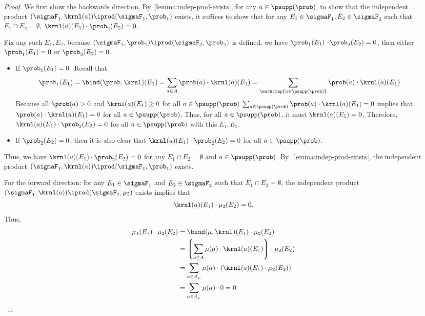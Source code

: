  \begin{proof}
    We first show the backwards direction.
  By~\cref{lemma:indep-prod-exists},
  for any $a \in \psupp(\prob)$, to show that the independent product
  $(\sigmaF_1, \krnl(a)) \iprod (\sigmaF_1, \prob_1)$ exists,
  it suffices to show that for any $E_1 \in \sigmaF_1, E_2 \in \sigmaF_2$
  such that $E_1 \cap E_2 = \emptyset$,
  $\krnl(a)(E_1) \cdot \prob_2(E_2) = 0$.

  Fix any such $E_1, E_2$,
  because $(\sigmaF_1, \prob_1) \iprod (\sigmaF_2, \prob_2)$ is defined,
  we have $\prob_1(E_1) \cdot \prob_2(E_2) = 0$, then either $\prob_1(E_1) = 0$
  or $\prob_2(E_2) = 0$.
\begin{itemize}
   \item If $\prob_1(E_1) = 0$:
   Recall that
\[
    \prob_1(E_1) = \bind(\prob, \krnl)(E_1)
    = \sum_{a \in A} \prob(a) \cdot \krnl(a) (E_1)
    = \sum_{\mathclap{a \in \psupp(\prob)}} \prob(a) \cdot \krnl(a) (E_1)
   \]
Because all $\prob(a) > 0$ and $\krnl(a) (E_1) \geq 0$ for all $a \in \psupp(\prob)$
   $\sum_{a \in \psupp(\prob)} \prob(a) \cdot \krnl(a) (E_1) = 0$ implies that
   $\prob(a) \cdot \krnl(a) (E_1) = 0$ for all $a \in \psupp(\prob)$.
   Thus, for all $a \in \psupp(\prob)$, it must $\krnl(a) (E_1) = 0$.
   Therefore, $\krnl(a)(E_1) \cdot \prob_2(E_2) = 0$ for all  $a \in \psupp(\prob)$
   with this $E_1, E_2$.

  \item If $\prob_2(E_2) = 0$, then it is also clear that
    $\krnl(a)(E_1) \cdot \prob_2(E_2) = 0$ for all  $a \in \psupp(\prob)$.
  \end{itemize}
Thus, we have $\krnl(a)(E_1) \cdot \prob_2(E_2) = 0$ for any
  $E_1 \cap E_2 = \emptyset$ and $a \in \psupp(\prob)$.
  By~\cref{lemma:indep-prod-exists},
  the independent product $(\sigmaF_1, \krnl(a)) \iprod (\sigmaF_1, \prob_1)$ exists.

    For the forward direction:
    for any $E_1 \in \sigmaF_1$ and $E_2 \in \sigmaF_2$ such that $E_1 \cap E_2 = \emptyset$,
   the independent product $(\sigmaF_1, \krnl(a)) \iprod (\sigmaF_2, \mu_2)$ exists implies that
   \begin{align*}
     \krnl(a) (E_1) \cdot \mu_2(E_2) = 0.
   \end{align*}
Thus,
   \begin{align*}
    \mu_1(E_1) \cdot \mu_2(E_2)
    &= \bind(\mu, \krnl)(E_1)  \cdot \mu_2(E_2) \\
    &= \left\lgroup\sum_{a \in A} \mu(a) \cdot \krnl(a) (E_1) \right\rgroup  \cdot \mu_2(E_2) \\
    &= \sum_{a \in A_{\mu}} \mu(a) \cdot \left(\krnl(a) (E_1)  \cdot \mu_2(E_2) \right) \\
    &= \sum_{a \in A_{\mu}} \mu(a) \cdot 0
    = 0
   \end{align*}


\end{proof}
